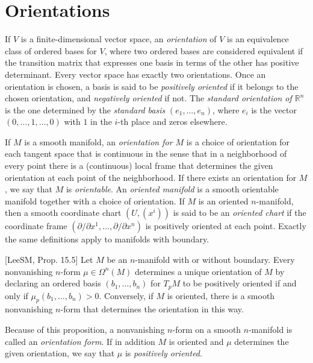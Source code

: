 \section{Orientations}

If $V$ is a finite-dimensional vector space, an \emph{orientation} of $V$ is an equivalence class of ordered bases for $V$, where two ordered bases are considered equivalent if the transition matrix that expresses one basis in terms of the other has positive determinant. Every vector space has exactly two orientations. Once an orientation is chosen, a basis is said to be \textit{positively oriented} if it belongs to the chosen orientation, and \textit{negatively oriented} if not. The \textit{standard orientation of $\mathbb{R}^n$} is the one determined by the \textit{standard basis} $(e_1, \ldots, e_n)$, where $e_i$ is the vector $(0, \ldots, 1, \ldots, 0)$ with $1$ in the $i$-th place and zeros elsewhere.

If $M$ is a smooth manifold, an \textit{orientation for $M$} is a choice of orientation for each tangent space that is continuous in the sense that in a neighborhood of every point there is a (continuous) local frame that determines the given orientation at each point of the neighborhood. If there exists an orientation for $M$, we say that $M$ is \textit{orientable}. An \textit{oriented manifold} is a smooth orientable manifold together with a choice of orientation. If $M$ is an oriented $n$-manifold, then a smooth coordinate chart $(U, (x^i))$ is said to be an \textit{oriented chart} if the coordinate frame $(\partial/\partial x^1, \ldots, \partial/\partial x^n)$ is positively oriented at each point. Exactly the same definitions apply to manifolds with boundary.

\begin{proposition}
\label{prop:orientation-determined-by-n-form}
[LeeSM, Prop. 15.5]
Let $M$ be an $n$-manifold with or without boundary. Every nonvanishing $n$-form $\mu \in \Omega^n(M)$ determines a unique orientation of $M$ by declaring an ordered basis $(b_1, \ldots, b_n)$ for $T_p M$ to be positively oriented if and only if $\mu_p(b_1, \ldots, b_n) > 0$. Conversely, if $M$ is oriented, there is a smooth nonvanishing $n$-form that determines the orientation in this way.
\end{proposition}

Because of this proposition, a nonvanishing $n$-form on a smooth $n$-manifold is called an \textit{orientation form}. If in addition $M$ is oriented and $\mu$ determines the given orientation, we say that $\mu$ is \textit{positively oriented}.


